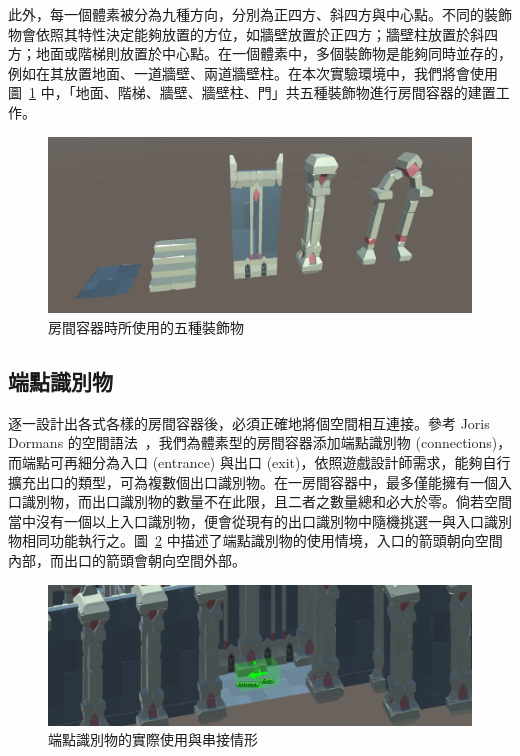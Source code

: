 此外，每一個體素被分為九種方向，分別為正四方、斜四方與中心點。不同的裝飾物會依照其特性決定能夠放置的方位，如牆壁放置於正四方；牆壁柱放置於斜四方；地面或階梯則放置於中心點。在一個體素中，多個裝飾物是能夠同時並存的，例如在其放置地面、一道牆壁、兩道牆壁柱。在本次實驗環境中，我們將會使用圖~\ref{fig:decorations-with-directions} 中，「地面、階梯、牆壁、牆壁柱、門」共五種裝飾物進行房間容器的建置工作。

\begin{figure}[ht]
  \begin{center}
    \includegraphics[width=1.0\textwidth]{figures/decorations-with-directions.png}
    \caption{房間容器時所使用的五種裝飾物}
    \label{fig:decorations-with-directions}
  \end{center}
\end{figure}

\subsection{端點識別物}
\label{ssec:method-spacepieces-connections}

逐一設計出各式各樣的房間容器後，必須正確地將個空間相互連接。參考 Joris Dormans 的空間語法~\cite{dormans2012engineering}，我們為體素型的房間容器添加端點識別物 (connections)，而端點可再細分為入口 (entrance) 與出口 (exit)，依照遊戲設計師需求，能夠自行擴充出口的類型，可為複數個出口識別物。在一房間容器中，最多僅能擁有一個入口識別物，而出口識別物的數量不在此限，且二者之數量總和必大於零。倘若空間當中沒有一個以上入口識別物，便會從現有的出口識別物中隨機挑選一與入口識別物相同功能執行之。圖~\ref{fig:connections-in-volume} 中描述了端點識別物的使用情境，入口的箭頭朝向空間內部，而出口的箭頭會朝向空間外部。

\begin{figure}[ht]
  \begin{center}
    \includegraphics[width=1.0\textwidth]{figures/connections-in-volume.png}
    \caption{端點識別物的實際使用與串接情形} 
    \label{fig:connections-in-volume}
  \end{center}
\end{figure}

